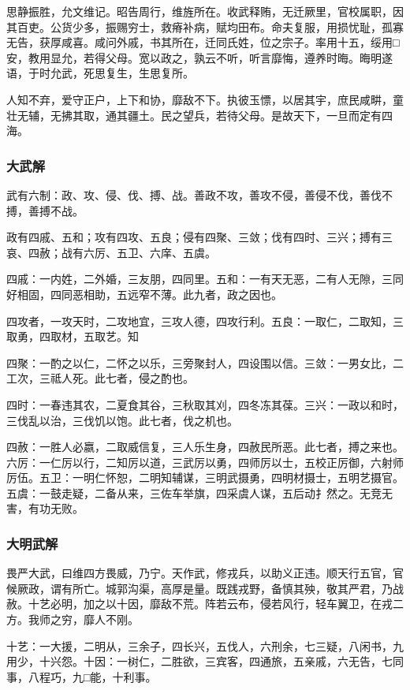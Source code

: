 \documentclass[]{article}
\begin{document}
思静振胜，允文维记。昭告周行，维旌所在。收武释贿，无迁厥里，官校属职，因其百吏。公货少多，振赐穷士，救瘠补病，赋均田布。命夫复服，用损忧耻，孤寡无告，获厚咸喜。咸问外戚，书其所在，迁同氏姓，位之宗子。率用十五，绥用□安，教用显允，若得父母。宽以政之，孰云不听，听言靡悔，遵养时晦。晦明遂语，于时允武，死思复生，生思复所。

人知不弃，爱守正户，上下和协，靡敌不下。执彼玉慓，以居其宇，庶民咸畊，童壮无辅，无拂其取，通其疆土。民之望兵，若待父母。是故天下，一旦而定有四海。

\hypertarget{header-n68}{%
\subsubsection{大武解}\label{header-n68}}

武有六制：政、攻、侵、伐、搏、战。善政不攻，善攻不侵，善侵不伐，善伐不搏，善搏不战。

政有四戚、五和；攻有四攻、五良；侵有四聚、三敛；伐有四时、三兴；搏有三哀、四赦；战有六厉、五卫、六庠、五虞。

四戚：一内姓，二外婚，三友朋，四同里。五和：一有天无恶，二有人无隙，三同好相固，四同恶相助，五远窄不薄。此九者，政之因也。

四攻者，一攻天时，二攻地宜，三攻人德，四攻行利。五良：一取仁，二取知，三取勇，四取材，五取艺。知

四聚：一酌之以仁，二怀之以乐，三旁聚封人，四设围以信。三敛：一男女比，二工次，三祗人死。此七者，侵之酌也。

四时：一春违其农，二夏食其谷，三秋取其刈，四冬冻其葆。三兴：一政以和时，三伐乱以治，三伐饥以饱。此七者，伐之机也。

四赦：一胜人必嬴，二取威信复，三人乐生身，四赦民所恶。此七者，搏之来也。六厉：一仁厉以行，二知厉以道，三武厉以勇，四师厉以士，五校正厉御，六射师厉伍。五卫：一明仁怀恕，二明知辅谋，三明武摄勇，四明材摄士，五明艺摄官。五虞：一鼓走疑，二备从来，三佐车举旗，四采虞人谋，五后动扌然之。无竞无害，有功无败。

\hypertarget{header-n78}{%
\subsubsection{大明武解}\label{header-n78}}

畏严大武，曰维四方畏威，乃宁。天作武，修戎兵，以助义正违。顺天行五官，官候厥政，谓有所亡。城郭沟渠，高厚是量。既践戎野，备慎其殃，敬其严君，乃战赦。十艺必明，加之以十因，靡敌不荒。阵若云布，侵若风行，轻车翼卫，在戎二方。我师之穷，靡人不刚。

十艺：一大援，二明从，三余子，四长兴，五伐人，六刑余，七三疑，八闲书，九用少，十兴怨。十因：一树仁，二胜欲，三宾客，四通旅，五亲戚，六无告，七同事，八程巧，九□能，十利事。
\end{document}
